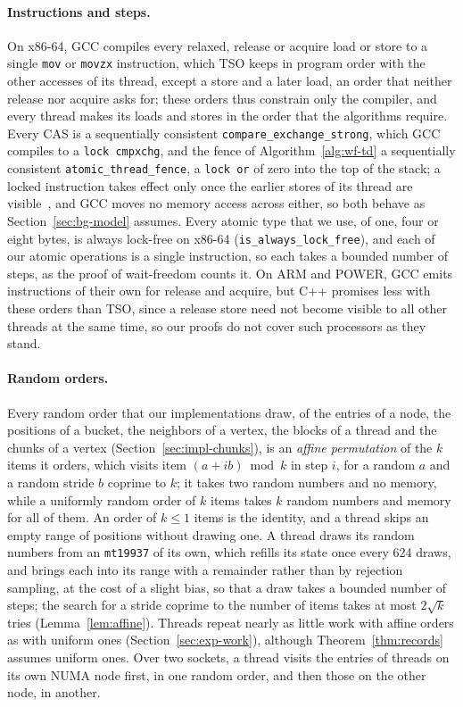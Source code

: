 \paragraph{Instructions and steps.} On x86-64, GCC compiles every relaxed, release or acquire load or store to a single \texttt{mov} or \texttt{movzx} instruction, which TSO keeps in program order with the other accesses of its thread, except a store and a later load, an order that neither release nor acquire asks for; these orders thus constrain only the compiler, and every thread makes its loads and stores in the order that the algorithms require. Every CAS is a sequentially consistent \texttt{compare\_exchange\_strong}, which GCC compiles to a \texttt{lock cmpxchg}, and the fence of Algorithm~\ref{alg:wf-td} a sequentially consistent \texttt{atomic\_thread\_fence}, a \texttt{lock or} of zero into the top of the stack; a locked instruction takes effect only once the earlier stores of its thread are visible~\cite{intelmanual}, and GCC moves no memory access across either, so both behave as Section~\ref{sec:bg-model} assumes. Every atomic type that we use, of one, four or eight bytes, is always lock-free on x86-64 (\texttt{is\_always\_lock\_free}), and each of our atomic operations is a single instruction, so each takes a bounded number of steps, as the proof of wait-freedom counts it. On ARM and POWER, GCC emits instructions of their own for release and acquire, but C++ promises less with these orders than TSO, since a release store need not become visible to all other threads at the same time, so our proofs do not cover such processors as they stand.

\paragraph{Random orders.} Every random order that our implementations draw, of the entries of a node, the positions of a bucket, the neighbors of a vertex, the blocks of a thread and the chunks of a vertex (Section~\ref{sec:impl-chunks}), is an \emph{affine permutation} of the $k$ items it orders, which visits item $(a + i b) \bmod k$ in step $i$, for a random $a$ and a random stride $b$ coprime to $k$; it takes two random numbers and no memory, while a uniformly random order of $k$ items takes $k$ random numbers and memory for all of them. An order of $k \leq 1$ items is the identity, and a thread skips an empty range of positions without drawing one. A thread draws its random numbers from an \texttt{mt19937} of its own, which refills its state once every 624 draws, and brings each into its range with a remainder rather than by rejection sampling, at the cost of a slight bias, so that a draw takes a bounded number of steps; the search for a stride coprime to the number of items takes at most $2\sqrt{k}$ tries (Lemma~\ref{lem:affine}). Threads repeat nearly as little work with affine orders as with uniform ones (Section~\ref{sec:exp-work}), although Theorem~\ref{thm:records} assumes uniform ones. Over two sockets, a thread visits the entries of threads on its own NUMA node first, in one random order, and then those on the other node, in another.

